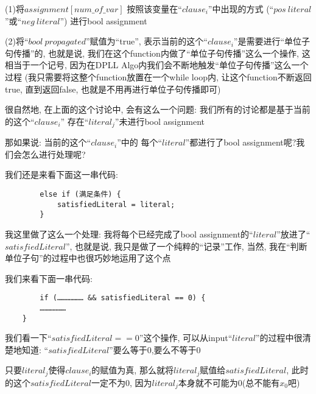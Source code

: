         (1)将$assignment[num\_of\_var]$
            按照该变量在``$clause_{i}$''中出现的方式
            (``$pos \ literal$''或``$neg \ literal$'')
            进行bool assignment
        \par
        (2)将``$bool\ propagated$''赋值为``true'',
            表示当前的这个``$clause_{i}$''是需要进行``单位子句传播''的,
            也就是说,
            我们在这个function内做了``单位子句传播''这么一个操作,
            这相当于一个记号,
            因为在DPLL Algo内我们会不断地触发``单位子句传播''这么一个过程
            (我只需要将这整个function放置在一个while loop内,
            让这个function不断返回true,
            直到返回false,
            也就是不用再进行单位子句传播即可)

        \par
        很自然地,
        在上面的这个讨论中,
        会有这么一个问题:
        我们所有的讨论都是基于当前的这个``$clause_{i}$''
        存在``$literal_{j}$''未进行bool assignment
        \par
        那如果说:
        当前的这个``$clause_{i}$''中的
        每个``$literal$''都进行了bool assignment呢?我们会怎么进行处理呢?
        \par
        我们还是来看下面这一串代码:
        \begin{lstlisting}
        else if (满足条件) {
            satisfiedLiteral = literal;  
        }
        \end{lstlisting}
        \par
        我这里做了这么一个处理:
        我将每个已经完成了bool assignment的``$literal$''放进了``$satisfiedLiteral$'',
        也就是说,
        我只是做了一个纯粹的``记录''工作,
        当然,
        我在``判断单位子句''的过程中也很巧妙地运用了这个点
        \par
        我们来看下面一串代码:
        \begin{lstlisting}
        if (……………… && satisfiedLiteral == 0) {
        ………………
    }
        \end{lstlisting}
        \par
        我们看一下``$satisfiedLiteral == 0$''这个操作,
        可以从input``$literal$''的过程中很清楚地知道:
        ``$satisfiedLiteral$''要么等于0,要么不等于0
        \par
        只要$literal_{j}$使得$clause_{i}$的赋值为真,
        那么就将$literal_{j}$赋值给$satisfiedLiteral$,
        此时的这个$satisfiedLiteral$一定不为0,
        因为$literal_{j}$本身就不可能为0(总不能有$x_{0}$吧)
        \par
